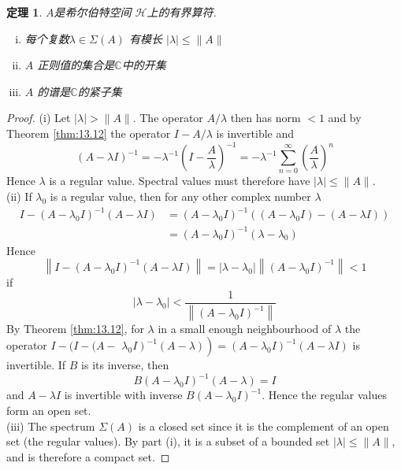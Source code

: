 \documentclass[hyperref,UTF8]{ctexbook}
\newtheorem{theorem}{定理}[chapter]
\begin{document}
\begin{theorem}\label{thm:13.17} 
    \(A\)是希尔伯特空间 \(\mathcal{H}\)上的有界算符.
    \begin{enumerate}[(i).]
        \item 每个复数\(\lambda \in \Sigma(A)\) 有模长 \(|\lambda| \leq\|A\|\)
        \item \(A\) 正则值的集合是\(\mathbb{C}\)中的开集
        \item \(A\) 的谱是\(\mathbb{C}\)的紧子集
    \end{enumerate}
\end{theorem}
\begin{proof}
    (i) Let \(|\lambda|>\|A\|\). The operator \(A / \lambda\) then has norm \(<1\) and by Theorem \ref{thm:13.12} the operator \(I-A / \lambda\) is invertible and
    \[
    (A-\lambda I)^{-1}=-\lambda^{-1}\left(I-\frac{A}{\lambda}\right)^{-1}=-\lambda^{-1} \sum_{n=0}^{\infty}\left(\frac{A}{\lambda}\right)^{n}
    \]
    Hence \(\lambda\) is a regular value. Spectral values must therefore have \(|\lambda| \leq\|A\|\).\\
    (ii) If \(\lambda_{0}\) is a regular value, then for any other complex number \(\lambda\)
    \[
    \begin{aligned}
    I-\left(A-\lambda_{0} I\right)^{-1}(A-\lambda I) &=\left(A-\lambda_{0} I\right)^{-1}\left(\left(A-\lambda_{0} I\right)-(A-\lambda I)\right) \\
    &=\left(A-\lambda_{0} I\right)^{-1}\left(\lambda-\lambda_{0}\right)
    \end{aligned}
    \]
    Hence
    \[
    \left\|I-\left(A-\lambda_{0} I\right)^{-1}(A-\lambda I)\right\|=\left|\lambda-\lambda_{0}\right|\left\|\left(A-\lambda_{0} I\right)^{-1}\right\|<1
    \]
    if
    \[
    \left|\lambda-\lambda_{0}\right|<\frac{1}{\left\|\left(A-\lambda_{0} I\right)^{-1}\right\|}
    \]
    By Theorem \ref{thm:13.12}, for \(\lambda\) in a small enough neighbourhood of \(\lambda\) the operator \(I-(I-(A-\) \(\left.\left.\lambda_{0} I\right)^{-1}(A-\lambda)\right)=\left(A-\lambda_{0} I\right)^{-1}(A-\lambda I)\) is invertible. If \(B\) is its inverse, then
    \[
    B\left(A-\lambda_{0} I\right)^{-1}(A-\lambda)=I
    \]
    and \(A-\lambda I\) is invertible with inverse \(B\left(A-\lambda_{0} I\right)^{-1}\). Hence the regular values form an open set.\\
    (iii) The spectrum \(\Sigma(A)\) is a closed set since it is the complement of an open set (the regular values). By part (i), it is a subset of a bounded set \(|\lambda| \leq\|A\|\), and is therefore a compact set.
\end{proof}
\end{document}
